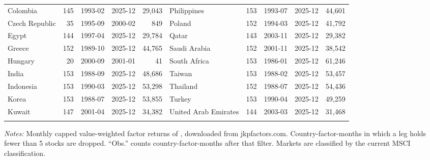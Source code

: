 \begin{table}[!ht]
\begin{tabular}{lrllr@{\hspace{6pt}}lrllr}
Colombia & 145 & 1993-02 & 2025-12 & 29,043 & Philippines & 153 & 1993-07 & 2025-12 & 44,601 \\
Czech Republic & 35 & 1995-09 & 2000-02 & 849 & Poland & 152 & 1994-03 & 2025-12 & 41,792 \\
Egypt & 144 & 1997-04 & 2025-12 & 29,784 & Qatar & 143 & 2003-11 & 2025-12 & 29,382 \\
Greece & 152 & 1989-10 & 2025-12 & 44,765 & Saudi Arabia & 152 & 2001-11 & 2025-12 & 38,542 \\
Hungary & 20 & 2000-09 & 2001-01 & 41 & South Africa & 153 & 1986-01 & 2025-12 & 61,246 \\
India & 153 & 1988-09 & 2025-12 & 48,686 & Taiwan & 153 & 1988-02 & 2025-12 & 53,457 \\
Indonesia & 153 & 1990-03 & 2025-12 & 53,298 & Thailand & 152 & 1988-07 & 2025-12 & 54,436 \\
Korea & 153 & 1988-07 & 2025-12 & 53,855 & Turkey & 153 & 1990-04 & 2025-12 & 49,259 \\
Kuwait & 147 & 2001-04 & 2025-12 & 34,382 & United Arab Emirates & 144 & 2003-03 & 2025-12 & 31,468 \\
\addlinespace
\bottomrule
\end{tabular}

\vspace{4pt}
\begin{minipage}{0.95\linewidth}\footnotesize
\textit{Notes:} Monthly capped value-weighted factor returns of \citet{jensen2023replication}, downloaded from jkpfactors.com. Country-factor-months in which a leg holds fewer than 5 stocks are dropped. ``Obs.'' counts country-factor-months after that filter. Markets are classified by the current MSCI classification.
\end{minipage}
\end{table}
